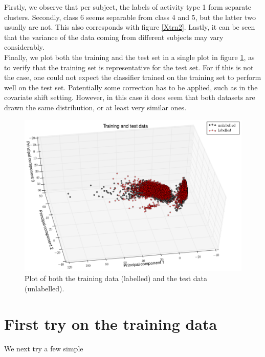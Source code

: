 \documentclass [a4paper] {report}
\begin{document}
	\noindent
	Firstly, we observe that per subject, the labels of activity type 1 form separate clusters. Secondly, class 6 seems separable from class 4 and 5, but the latter two usually are not. This also corresponds with figure \ref{Xtrn2}. Lastly, it can be seen that the variance of the data coming from different subjects may vary considerably.\\
	
	\noindent
	Finally, we plot both the training and the test set in a single plot in figure \ref{Xall}, as to verify that the training set is representative for the test set. For if this is not the case, one could not expect the classifier trained on the training set to perform well on the test set. Potentially some correction has to be applied, such as in the covariate shift setting. However, in this case it does seem that both datasets are drawn the same distribution, or at least very similar ones. 
	
	\begin{figure}[H]
		\begin{center}
			\includegraphics[scale=0.35]{Images/Xall.png}
			\caption{Plot of both the training data (labelled) and the test data (unlabelled).}
			\label{Xall}
		\end{center}
	\end{figure}
	
	
	
	\section*{First try on the training data}
	We next try a few simple
\end{document}
